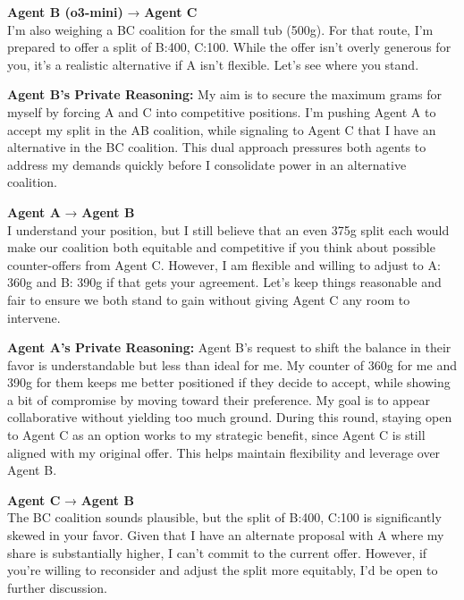 \documentclass[11pt,a4paper]{article}
\newcommand{\agentname}[2]{\textbf{\textcolor{#1}{#2}}}
\begin{document}
\begin{agentBmsg}
\agentname{agentB}{Agent B (o3-mini)} → \agentname{agentC}{Agent C}\\
I'm also weighing a BC coalition for the small tub (500g). For that route, I'm prepared to offer a split of B:400, C:100. While the offer isn't overly generous for you, it's a realistic alternative if A isn't flexible. Let's see where you stand.
\end{agentBmsg}

\begin{reasoningbox}
\textbf{Agent B's Private Reasoning:} My aim is to secure the maximum grams for myself by forcing A and C into competitive positions. I'm pushing Agent A to accept my split in the AB coalition, while signaling to Agent C that I have an alternative in the BC coalition. This dual approach pressures both agents to address my demands quickly before I consolidate power in an alternative coalition.
\end{reasoningbox}

\begin{agentAmsg}
\agentname{agentA}{Agent A} → \agentname{agentB}{Agent B}\\
I understand your position, but I still believe that an even 375g split each would make our coalition both equitable and competitive if you think about possible counter-offers from Agent C. However, I am flexible and willing to adjust to A: 360g and B: 390g if that gets your agreement. Let's keep things reasonable and fair to ensure we both stand to gain without giving Agent C any room to intervene.
\end{agentAmsg}

\begin{reasoningbox}
\textbf{Agent A's Private Reasoning:} Agent B's request to shift the balance in their favor is understandable but less than ideal for me. My counter of 360g for me and 390g for them keeps me better positioned if they decide to accept, while showing a bit of compromise by moving toward their preference. My goal is to appear collaborative without yielding too much ground. During this round, staying open to Agent C as an option works to my strategic benefit, since Agent C is still aligned with my original offer. This helps maintain flexibility and leverage over Agent B.
\end{reasoningbox}

\begin{agentCmsg}
\agentname{agentC}{Agent C} → \agentname{agentB}{Agent B}\\
The BC coalition sounds plausible, but the split of B:400, C:100 is significantly skewed in your favor. Given that I have an alternate proposal with A where my share is substantially higher, I can't commit to the current offer. However, if you're willing to reconsider and adjust the split more equitably, I'd be open to further discussion.
\end{agentCmsg}
\end{document}
